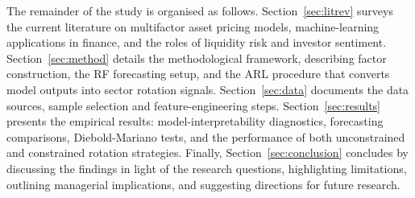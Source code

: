 The remainder of the study is organised as follows.  Section~\ref{sec:litrev} surveys the current literature on multifactor asset pricing models, machine-learning applications in finance, and the roles of liquidity risk and investor sentiment.  Section~\ref{sec:method} details the methodological framework, describing factor construction, the RF forecasting setup, and the ARL procedure that converts model outputs into sector rotation signals.  Section~\ref{sec:data} documents the data sources, sample selection and feature-engineering steps. Section~\ref{sec:results} presents the empirical results: model-interpretability diagnostics, forecasting comparisons, Diebold-Mariano tests, and the performance of both unconstrained and constrained rotation strategies. Finally, Section~\ref{sec:conclusion} concludes by discussing the findings in light of the research questions, highlighting limitations, outlining managerial implications, and suggesting directions for future research.
